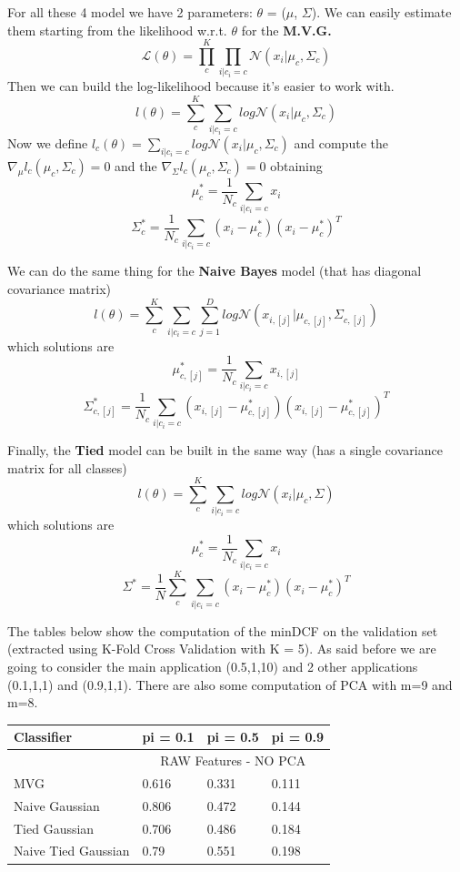 \documentclass[english]{report}
\begin{document}
For all these 4 model we have 2 parameters: $\theta$ = ($\mu$, $\Sigma$). We can easily estimate them starting 
from the likelihood w.r.t. $\theta$ for the \textbf{M.V.G.}
\[ \mathcal{L} (\theta) = \prod_{c}^{K}\prod_{i|c_i=c} \mathcal{N} (x_i|\mu_c,\Sigma_c)\]
Then we can build the log-likelihood because it's easier to work with.
\[ l (\theta) = \sum_{c}^{K}\sum_{i|c_i=c} log \mathcal{N} (x_i|\mu_c,\Sigma_c)\]
Now we define \( l_c (\theta) = \sum_{i|c_i=c} log \mathcal{N} (x_i|\mu_c,\Sigma_c)\) and compute 
the $\nabla_\mu l_c(\mu_c,\Sigma_c) = 0$ and the $\nabla_\Sigma l_c(\mu_c,\Sigma_c) = 0$ 
obtaining 
\[\mu_c^* = \frac{1}{N_c}\sum_{i|c_i=c}x_i\] 
\[\Sigma_c^* = \frac{1}{N_c}\sum_{i|c_i=c}(x_i-\mu_c^*)(x_i-\mu_c^*)^T\] 

We can do the same thing for the \textbf{Naive Bayes} model (that has diagonal covariance matrix)
\[ l (\theta) = \sum_{c}^{K}\sum_{i|c_i=c}\sum_{j=1}^{D} log \mathcal{N} (x_{i,[j]}|\mu_{c,[j]},\Sigma_{c,[j]})\]
which solutions are
\[\mu_{c,[j]}^* = \frac{1}{N_c}\sum_{i|c_i=c}x_{i,[j]}\] 
\[\Sigma_{c,[j]}^* = \frac{1}{N_c}\sum_{i|c_i=c}(x_{i,[j]}-\mu_{c,[j]}^*)(x_{i,[j]}-\mu_{c,[j]}^*)^T\] 

Finally, the \textbf{Tied} model can be built in the same way (has a single covariance matrix for all classes)
\[ l (\theta) = \sum_{c}^{K}\sum_{i|c_i=c} log \mathcal{N} (x_i|\mu_c,\Sigma)\]
which solutions are
\[\mu_{c}^* = \frac{1}{N_c}\sum_{i|c_i=c}x_{i}\] 
\[\Sigma^* = \frac{1}{N}\sum_{c}^{K}\sum_{i|c_i=c}(x_{i}-\mu_{c}^*)(x_{i}-\mu_{c}^*)^T\] 

The tables below show the computation of the minDCF on the validation set (extracted using K-Fold Cross Validation with K = 5).
As said before we are going to consider the main application (0.5,1,10) and 2 other applications (0.1,1,1) and (0.9,1,1).
There are also some computation of PCA with m=9 and m=8.

\begin{table}[H]
    \centering
    \begin{tabular}{@{}llll@{}}
    \toprule
    Classifier          & pi = 0.1  & pi = 0.5  & pi = 0.9 \\ \midrule
                        & \multicolumn{3}{c}{RAW Features - NO PCA} \\ \midrule
    MVG                 & 0.616     & 0.331     & 0.111    \\
    Naive Gaussian      & 0.806     & 0.472     & 0.144    \\
    Tied Gaussian       & 0.706     & 0.486     & 0.184    \\
    Naive Tied Gaussian & 0.79      & 0.551     & 0.198    \\ \bottomrule
    \end{tabular}\label{tab:table}
\end{table}
\end{document}
